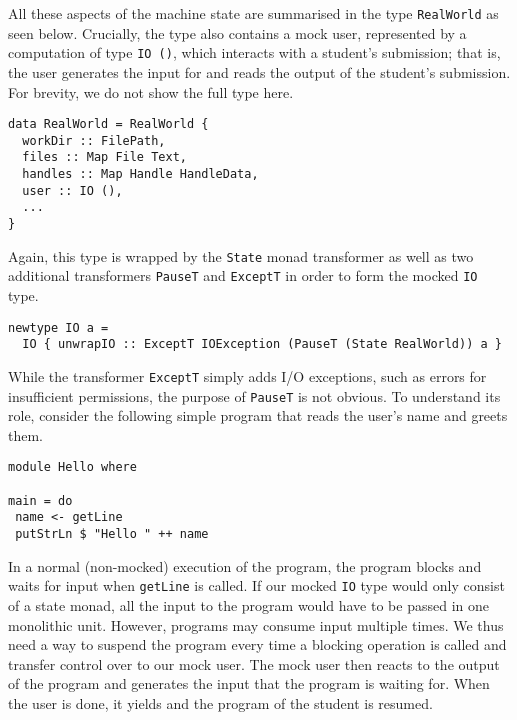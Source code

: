 All these aspects of the machine state are summarised in the type \texttt{RealWorld} as seen below.
Crucially, the type also contains a mock user,
represented by a computation of type \texttt{IO ()},
which interacts with a student's submission;
that is, the user generates the input for and reads the output of the student's submission.
For brevity, we do not show the full type here.
\begin{verbatim}
data RealWorld = RealWorld {
  workDir :: FilePath,
  files :: Map File Text,
  handles :: Map Handle HandleData,
  user :: IO (),
  ...
}
\end{verbatim}
Again, this type is wrapped by the \texttt{State} monad transformer as well as two additional transformers \texttt{PauseT} and \texttt{ExceptT} in order to form the mocked \texttt{IO} type.
\begin{verbatim}
newtype IO a =
  IO { unwrapIO :: ExceptT IOException (PauseT (State RealWorld)) a }
\end{verbatim}
While the transformer \texttt{ExceptT} simply adds I/O exceptions,
such as errors for insufficient permissions,
the purpose of \texttt{PauseT} is not obvious.
To understand its role, consider the following simple program that reads the user's name and greets them.
\begin{verbatim}
module Hello where

main = do
 name <- getLine
 putStrLn $ "Hello " ++ name
\end{verbatim}
In a normal (non-mocked) execution of the program, the program blocks and waits for input when \texttt{getLine} is called.
If our mocked \texttt{IO} type would only consist of a state monad,
all the input to the program would have to be passed in one monolithic unit.
However, programs may consume input multiple times.
We thus need a way to suspend the program every time a blocking operation is called and transfer control over to our mock user.
The mock user then reacts to the output of the program and generates the input that the program is waiting for.
When the user is done, it yields and the program of the student is resumed.

